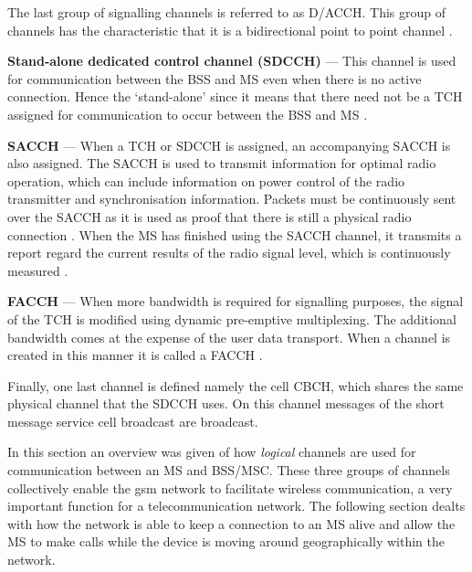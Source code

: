 The last group of signalling channels is referred to as \gls{D/ACCH}. This group of channels has the characteristic that it is a bidirectional point to point channel \cite{GSMArchitectureProtocolsServices}.
\begin{description}
  \item{\textbf{Stand-alone dedicated control channel (\gls{SDCCH})}} --- This channel is used for communication between the \gls{BSS} and \gls{MS} even when there is no active connection\cite{GSMArchitectureProtocolsServices}. Hence the `stand-alone' since it means that there need not be a \gls{TCH} assigned for communication to occur between the \gls{BSS} and \gls{MS} \cite{GSMArchitectureProtocolsServices}.
  \item{\textbf{\gls{SACCH}}} --- When a \gls{TCH} or \gls{SDCCH} is assigned, an accompanying \gls{SACCH} is also assigned. The \gls{SACCH} is used to transmit information for optimal radio operation, which can include information on power control of the radio transmitter and synchronisation information\cite{GSMArchitectureProtocolsServices}. Packets must be continuously sent over the \gls{SACCH} as it is used as proof that there is still a physical radio connection \cite{GSMArchitectureProtocolsServices}. When the \gls{MS} has finished using the \gls{SACCH} channel, it transmits a report regard the current results of the radio signal level, which is continuously measured \cite{GSMArchitectureProtocolsServices}.
  \item{\textbf{\gls{FACCH}}} --- When more bandwidth is required for signalling purposes, the signal of the \gls{TCH} is modified using dynamic pre-emptive multiplexing. The additional bandwidth comes at the expense of the user data transport\cite{GSMArchitectureProtocolsServices}. When a channel is created in this manner it is called a \gls{FACCH} \cite{GSMArchitectureProtocolsServices}.
\end{description}

Finally, one last channel is defined namely the cell \gls{CBCH}, which shares the same physical channel that the \gls{SDCCH} uses. On this channel messages of the short message service cell broadcast are broadcast\cite{GSMArchitectureProtocolsServices}.

In this section an overview was given of how \emph{logical} channels are used for communication between an \gls{MS}  and \gls{BSS}/\gls{MSC}\@. These three groups of channels collectively enable the \gls{gsm} network to facilitate wireless communication, a very important function for a telecommunication network. The following section dealts with how the network is able to keep a connection to an \gls{MS} alive and allow the \gls{MS} to make calls while the device is moving around geographically within the network.

